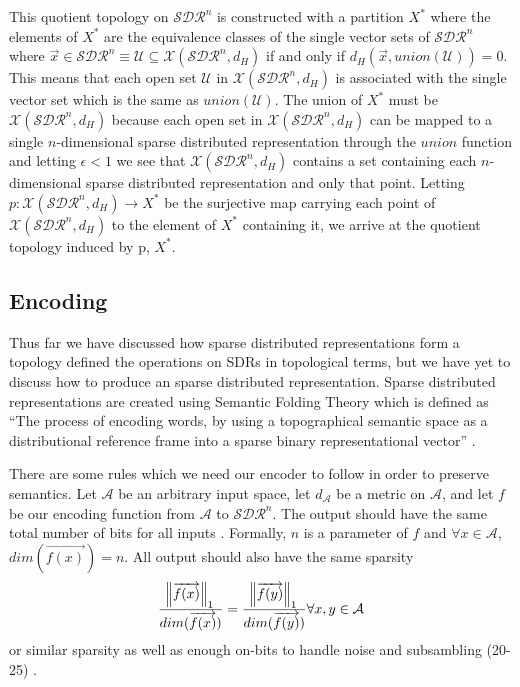 \documentclass[fleqn,notitlepage,minimal]{article}
\begin{document}
	
	This quotient topology on $\mathcal{SDR}^{n}$ is constructed with a partition $X^{*}$ where the elements of $X^{*}$ are the equivalence classes of the single vector sets of $\mathcal{SDR}^{n}$ where $\overrightarrow{x} \in \mathcal{SDR}^{n} \equiv \mathcal{U} \subseteq \mathcal{X}(\mathcal{SDR}^{n}, d_{H})$ if and only if $d_H(\overrightarrow{x}, union(\mathcal{U})) = 0$. This means that each open set $\mathcal{U}$ in $\mathcal{X}(\mathcal{SDR}^{n}, d_{H})$ is associated with the single vector set which is the same as $union(\mathcal{U})$. The union of $X^{*}$ must be $\mathcal{X}(\mathcal{SDR}^{n}, d_{H})$ because each open set in $\mathcal{X}(\mathcal{SDR}^{n}, d_{H})$ can be mapped to a single $n$-dimensional sparse distributed representation through the $union$ function and letting $\epsilon < 1$ we see that $\mathcal{X}(\mathcal{SDR}^{n}, d_{H})$ contains a set containing each $n$-dimensional sparse distributed representation and only that point. Letting $p : \mathcal{X}(\mathcal{SDR}^{n}, d_{H}) \longrightarrow X^{*}$ be the surjective map carrying each point of $\mathcal{X}(\mathcal{SDR}^{n}, d_{H})$ to the element of $X^{*}$ containing it, we arrive at the quotient topology induced by p, $X^{*}$.
	
	
	\subsection{Encoding}
	
	Thus far we have discussed how sparse distributed representations form a topology defined the operations on SDRs in topological terms, but we have yet to discuss how to produce an sparse distributed representation. Sparse distributed representations are created using Semantic Folding Theory which is defined as ``The process of encoding words, by using a topographical semantic space as a distributional reference frame into a sparse binary representational vector'' \cite{Semantic}.
	
	
	There are some rules which we need our encoder to follow in order to preserve semantics. Let $\mathcal{A}$ be an arbitrary input space, let $d_{\mathcal{A}}$ be a metric on $\mathcal{A}$, and let $f$ be our encoding function from $\mathcal{A}$ to $\mathcal{SDR}^{n}$. The output should have the same total number of bits for all inputs \cite{Purdy}. Formally, $n$ is a parameter of $f$ and $\forall x \in \mathcal{A}$,  $dim(\overrightarrow{f(x)}) = n$. All output should also have the same sparsity $$\frac{\norm{\overrightarrow{f(x)}}_{1}}{dim(\overrightarrow{f(x)})} = \frac{\norm{\overrightarrow{f(y)}}_{1}}{dim(\overrightarrow{f(y)})} \forall x,y \in \mathcal{A}$$ or similar sparsity as well as enough on-bits to handle noise and subsambling (20-25) \cite{Purdy}. 
	
\end{document}
